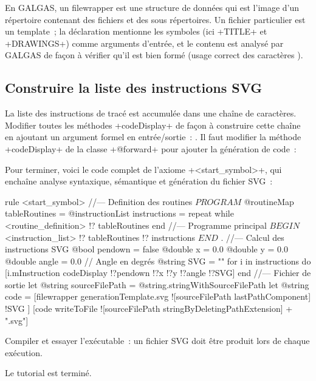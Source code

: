 En GALGAS, un filewrapper est une structure de données qui est l'image d'un répertoire contenant des fichiers et des sous répertoires. Un fichier particulier est un template~; la déclaration mentionne les symboles (ici \ggst+TITLE+ et \ggst+DRAWINGS+) comme arguments d'entrée, et le contenu est analysé par GALGAS de façon à vérifier qu'il est bien formé (usage correct des caractères \tpp{\%}).

\subsection{Construire la liste des instructions SVG}
La liste des instructions de tracé est accumulée dans une chaîne de caractères. Modifier toutes les méthodes \ggst+codeDisplay+ de façon à construire cette chaîne en ajoutant un argument formel en entrée/sortie~: . Il faut modifier la méthode \ggst+codeDisplay+ de la classe \ggst+@forward+ pour ajouter la génération de code~:


Pour terminer, voici le code complet de l’axiome \ggst+<start_symbol>+, qui enchaîne analyse syntaxique, sémantique et génération du fichier SVG~:
\begin{galgas3}
rule <start_symbol> {
//--- Definition des routines
  $PROGRAM$
  @routineMap tableRoutines = {}
  @instructionList instructions = {}
  repeat
  while
    <routine_definition> !? tableRoutines
  end
//--- Programme principal
  $BEGIN$
  <instruction_list> !? tableRoutines !? instructions
  $END$
  $.$
//--- Calcul des instructions SVG
  @bool pendown = false
  @double x = 0.0
  @double y = 0.0
  @double angle = 0.0 // Angle en degrés
  @string SVG = ""
  for i in instructions do
    [i.mInstruction codeDisplay !?pendown !?x !?y !?angle !?SVG]
  end
//--- Fichier de sortie
  let @string sourceFilePath = @string.stringWithSourceFilePath
  let @string code = [filewrapper generationTemplate.svg
    ![sourceFilePath lastPathComponent]
    !SVG
  ]
  [code writeToFile ![sourceFilePath stringByDeletingPathExtension] + ".svg"]
}
\end{galgas3}

Compiler et essayer l'exécutable~: un fichier SVG doit être produit lors de chaque exécution.

Le tutorial est terminé.
